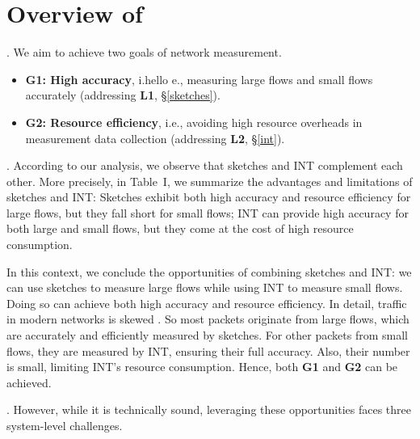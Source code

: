 \section{Overview of \sysname}\label{overview}

. We aim to achieve two goals of network measurement.

\begin{itemize}[leftmargin=*]
%
    \item \textbf{G1: High accuracy}, i.hello e., measuring large flows and small flows accurately (addressing \textbf{L1}, \S\ref{sketches}). 
%
    \item \textbf{G2: Resource efficiency}, i.e., avoiding high resource overheads in measurement data collection (addressing \textbf{L2}, \S\ref{int}). 
%
\end{itemize}

. According to our analysis, we observe that sketches and INT complement each other. More precisely, in Table~I, we summarize the advantages and limitations of sketches and INT: Sketches exhibit both high accuracy and resource efficiency for large flows, but they fall short for small flows; INT can provide high accuracy for both large and small flows, but they come at the cost of high resource consumption. 

In this context, we conclude the opportunities of combining sketches and INT: we can use sketches to measure large flows while using INT to measure small flows. Doing so can achieve both high accuracy and resource efficiency. In detail, traffic in modern networks is skewed \cite{roy2015inside,huang2021toward,caida,benson2010network,yang2018elastic}. So most packets originate from large flows, which are accurately and efficiently measured by sketches. For other packets from small flows, they are measured by INT, ensuring their full accuracy. Also, their number is small, limiting INT's resource consumption. Hence, both \textbf{G1} and \textbf{G2} can be achieved. 

.
However, while it is technically sound, leveraging these opportunities faces three system-level challenges.

